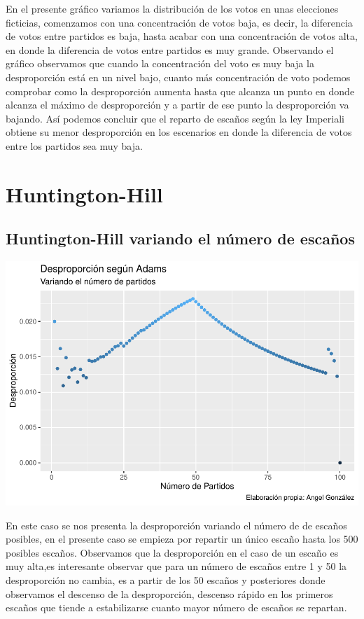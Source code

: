 \documentclass[12pt,a4paper,]{book}
\numberwithin{dummy}{section}
\theoremstyle{ocrenumbox}
\theoremstyle{blacknumex}
\theoremstyle{blacknumbox}
\theoremstyle{ocrenum}
\theoremstyle{ocrenum}
\begin{document}
En el presente gráfico variamos la distribución de los votos en unas
elecciones ficticias, comenzamos con una concentración de votos baja, es
decir, la diferencia de votos entre partidos es baja, hasta acabar con
una concentración de votos alta, en donde la diferencia de votos entre
partidos es muy grande. Observando el gráfico observamos que cuando la
concentración del voto es muy baja la desproporción está en un nivel
bajo, cuanto más concentración de voto podemos comprobar como la
desproporción aumenta hasta que alcanza un punto en donde alcanza el
máximo de desproporción y a partir de ese punto la desproporción va
bajando. Así podemos concluir que el reparto de escaños según la ley
Imperiali obtiene su menor desproporción en los escenarios en donde la
diferencia de votos entre los partidos sea muy baja.

\hypertarget{huntington-hill}{%
\section{Huntington-Hill}\label{huntington-hill}}

\hypertarget{huntington-hill-variando-el-nuxfamero-de-escauxf1os}{%
\subsection{Huntington-Hill variando el número de
escaños}\label{huntington-hill-variando-el-nuxfamero-de-escauxf1os}}

\begin{center}\includegraphics[width=0.95\linewidth]{figurasR/unnamed-chunk-32-1} \end{center}

En este caso se nos presenta la desproporción variando el número de de
escaños posibles, en el presente caso se empieza por repartir un único
escaño hasta los 500 posibles escaños. Observamos que la desproporción
en el caso de un escaño es muy alta,es interesante observar que para un
número de escaños entre 1 y 50 la desproporción no cambia, es a partir
de los 50 escaños y posteriores donde observamos el descenso de la
desproporción, descenso rápido en los primeros escaños que tiende a
estabilizarse cuanto mayor número de escaños se repartan.
\end{document}
